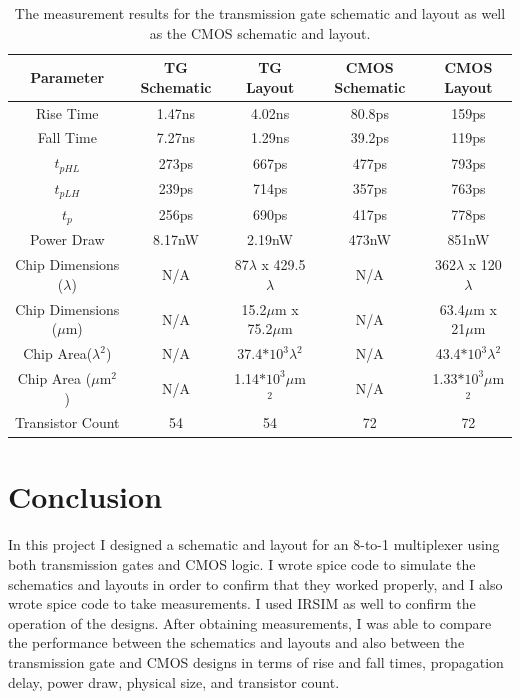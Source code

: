 \documentclass{article}
\begin{document}
  \begin{table}[H]
    \centering
    \footnotesize
    \begin{tabular}{|c|c|c|c|c|}
      \hline
      \textbf{Parameter} & \textbf{TG Schematic} & \textbf{TG Layout} & \textbf{CMOS Schematic} & \textbf{CMOS Layout} \\
      \hline
      Rise Time & 1.47ns & 4.02ns & 80.8ps & 159ps \\
      \hline
      Fall Time & 7.27ns & 1.29ns & 39.2ps & 119ps\\
      \hline
      $t_{pHL}$ & 273ps & 667ps & 477ps & 793ps\\
      \hline
      $t_{pLH}$ & 239ps & 714ps & 357ps & 763ps\\
      \hline
      $t_{p}$ & 256ps & 690ps & 417ps & 778ps\\
      \hline
      Power Draw & 8.17nW & 2.19nW & 473nW & 851nW \\
      \hline
      Chip Dimensions ($\lambda$) & N/A & 87$\lambda$ x 429.5$\lambda$ & N/A & 362$\lambda$ x 120$\lambda$ \\
      \hline
      Chip Dimensions ($\mu$m) & N/A & 15.2$\mu$m x 75.2$\mu$m & N/A & 63.4$\mu$m x 21$\mu$m \\
      \hline
      Chip Area($\lambda^2$) & N/A & 37.4$*10^3\lambda^2$ & N/A & 43.4$*10^3\lambda^2$ \\
      \hline
      Chip Area ($\mu$m$^2$) & N/A & 1.14$*10^3\mu$m$^2$ & N/A & 1.33$*10^3\mu$m$^2$ \\
      \hline
      Transistor Count & 54 & 54 & 72 & 72 \\
      \hline
    \end{tabular}
    \caption{The measurement results for the transmission gate schematic and layout as well as the CMOS schematic and layout.}
    \label{table:measurements}
  \end{table}


\section{Conclusion}
  \paragraph{}
  In this project I designed a schematic and layout for an 8-to-1 multiplexer using both transmission gates and CMOS logic. I wrote spice code to simulate the schematics and layouts in order to confirm that they worked properly, and I also wrote spice code to take measurements. I used IRSIM as well to confirm the operation of the designs. After obtaining measurements, I was able to compare the performance between the schematics and layouts and also between the transmission gate and CMOS designs in terms of rise and fall times, propagation delay, power draw, physical size, and transistor count. 
\end{document}
